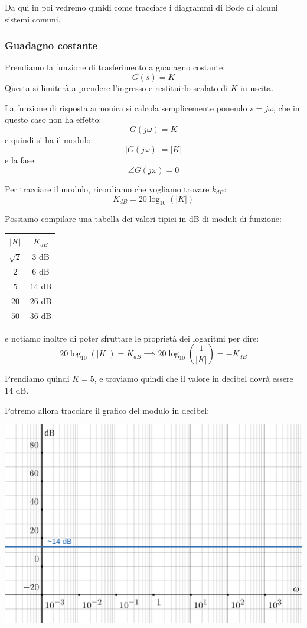 \documentclass[a4paper,11pt]{article}
\begin{document}
Da qui in poi vedremo qunidi come tracciare i diagrammi di Bode di alcuni sistemi comuni.

\subsubsection{Guadagno costante}
Prendiamo la funzione di trasferimento a guadagno costante:
$$
G(s) = K
$$
Questa si limiterà a prendere l'ingresso e restituirlo scalato di $K$ in uscita.

La funzione di risposta armonica si calcola semplicemente ponendo $s = j \omega$, che in questo caso non ha effetto:
$$
G(j \omega) = K 
$$
e quindi si ha il modulo:
$$
|G(j \omega)| = |K|
$$
e la fase:
$$
\angle G(j \omega) = 0 
$$

Per tracciare il modulo, ricordiamo che vogliamo trovare $k_{dB}$:
$$
K_{dB} = 20 \log_{10}(|K|) 
$$

Possiamo compilare una tabella dei valori tipici in dB di moduli di funzione:
\begin{table}[H]
	\center {}
	\begin{tabular} { c | c }
		$|K|$ & $K_{dB}$ \\ 
		\hline
		$\sqrt{2}$ & $3$ dB \\
		$2$ & $6$ dB \\
		$5$ & $14$ dB \\
		$20$ & $26$ dB \\
		$50$ & $36$ dB 
	\end{tabular}
\end{table}
e notiamo inoltre di poter sfruttare le proprietà dei logaritmi per dire:
$$
20 \log_{10}(|K|) = K_{dB} \implies 20 \log_{10}\left(\frac{1}{|K|}\right) = - K_{dB}
$$

Prendiamo quindi $K = 5$, e troviamo quindi che il valore in decibel dovrà essere $14$ dB.

\par\bigskip

\noindent
\begin{minipage}{\textwidth}
Potremo allora tracciare il grafico del modulo in decibel:
\begin{center}
	\includegraphics[scale=0.3]{../figures/costant_bode/mod.png}
\end{center}
\end{minipage}
\end{document}
